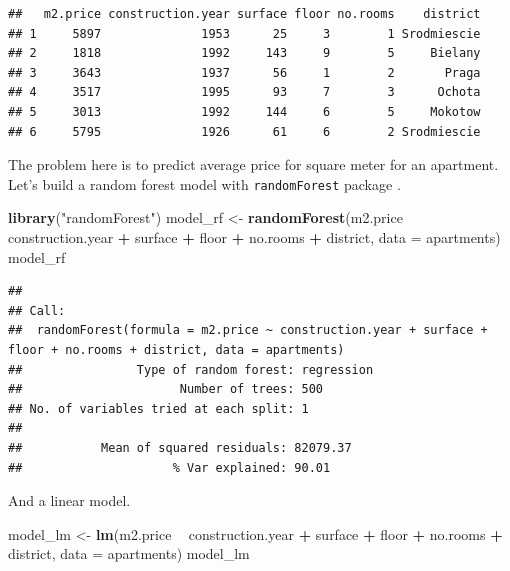 \documentclass[]{book}
\newenvironment{Shaded}{\begin{snugshade}}{\end{snugshade}}
\newcommand{\DataTypeTok}[1]{\textcolor[rgb]{0.13,0.29,0.53}{#1}}
\newcommand{\KeywordTok}[1]{\textcolor[rgb]{0.13,0.29,0.53}{\textbf{#1}}}
\newcommand{\NormalTok}[1]{#1}
\newcommand{\OperatorTok}[1]{\textcolor[rgb]{0.81,0.36,0.00}{\textbf{#1}}}
\newcommand{\StringTok}[1]{\textcolor[rgb]{0.31,0.60,0.02}{#1}}
\theoremstyle{definition}
\theoremstyle{definition}
\theoremstyle{definition}
\theoremstyle{remark}
\begin{document}
\begin{verbatim}
##   m2.price construction.year surface floor no.rooms    district
## 1     5897              1953      25     3        1 Srodmiescie
## 2     1818              1992     143     9        5     Bielany
## 3     3643              1937      56     1        2       Praga
## 4     3517              1995      93     7        3      Ochota
## 5     3013              1992     144     6        5     Mokotow
## 6     5795              1926      61     6        2 Srodmiescie
\end{verbatim}

The problem here is to predict average price for square meter for an
apartment. Let's build a random forest model with \texttt{randomForest}
package \citep{R-randomForest}.

\begin{Shaded}
\begin{Highlighting}[]
\KeywordTok{library}\NormalTok{(}\StringTok{"randomForest"}\NormalTok{)}
\NormalTok{model_rf <-}\StringTok{ }\KeywordTok{randomForest}\NormalTok{(m2.price }\OperatorTok{~}\StringTok{ }\NormalTok{construction.year }\OperatorTok{+}\StringTok{ }\NormalTok{surface }\OperatorTok{+}\StringTok{ }\NormalTok{floor }\OperatorTok{+}\StringTok{ }\NormalTok{no.rooms }\OperatorTok{+}\StringTok{ }\NormalTok{district, }\DataTypeTok{data =}\NormalTok{ apartments)}
\NormalTok{model_rf}
\end{Highlighting}
\end{Shaded}

\begin{verbatim}
## 
## Call:
##  randomForest(formula = m2.price ~ construction.year + surface +      floor + no.rooms + district, data = apartments) 
##                Type of random forest: regression
##                      Number of trees: 500
## No. of variables tried at each split: 1
## 
##           Mean of squared residuals: 82079.37
##                     % Var explained: 90.01
\end{verbatim}

And a linear model.

\begin{Shaded}
\begin{Highlighting}[]
\NormalTok{model_lm <-}\StringTok{ }\KeywordTok{lm}\NormalTok{(m2.price }\OperatorTok{~}\StringTok{ }\NormalTok{construction.year }\OperatorTok{+}\StringTok{ }\NormalTok{surface }\OperatorTok{+}\StringTok{ }\NormalTok{floor }\OperatorTok{+}\StringTok{ }\NormalTok{no.rooms }\OperatorTok{+}\StringTok{ }\NormalTok{district, }\DataTypeTok{data =}\NormalTok{ apartments)}
\NormalTok{model_lm}
\end{Highlighting}
\end{Shaded}
\end{document}
